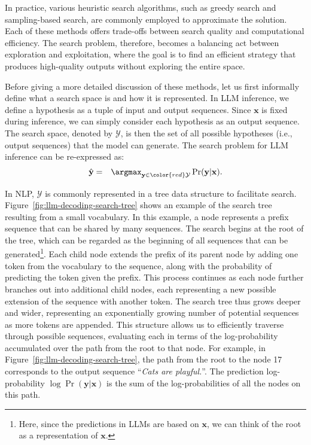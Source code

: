 In practice, various heuristic search algorithms, such as greedy search and sampling-based search, are commonly employed to approximate the solution. Each of these methods offers trade-offs between search quality and computational efficiency. The search problem, therefore, becomes a balancing act between exploration and exploitation, where the goal is to find an efficient strategy that produces high-quality outputs without exploring the entire space.

Before giving a more detailed discussion of these methods, let us first informally define what a search space is and how it is represented. In LLM inference, we define a hypothesis as a tuple of input and output sequences. Since $\mathbf{x}$ is fixed during inference, we can simply consider each hypothesis as an output sequence. The search space, denoted by $\mathcal{Y}$, is then the set of all possible hypotheses (i.e., output sequences) that the model can generate. The search problem for LLM inference can be re-expressed as:
\begin{eqnarray}
\hat{\mathbf{y}} & = & \argmax_{\mathbf{y} \in {\color{red} \mathcal{Y}}} \Pr(\mathbf{y}|\mathbf{x}). \label{eq:llm-general-decoding-objective}
\end{eqnarray}

In NLP, $\mathcal{Y}$ is commonly represented in a tree data structure to facilitate search. Figure~\ref{fig:llm-decoding-search-tree} shows an example of the search tree resulting from a small vocabulary. In this example, a node represents a prefix sequence that can be shared by many sequences. The search begins at the root of the tree, which can be regarded as the beginning of all sequences that can be generated\footnote{Here, since the predictions in LLMs are based on $\mathbf{x}$, we can think of the root as a representation of $\mathbf{x}$.}. Each child node extends the prefix of its parent node by adding one token from the vocabulary to the sequence, along with the probability of predicting the token given the prefix. This process continues as each node further branches out into additional child nodes, each representing a new possible extension of the sequence with another token. The search tree thus grows deeper and wider, representing an exponentially growing number of potential sequences as more tokens are appended. This structure allows us to efficiently traverse through possible sequences, evaluating each in terms of the log-probability accumulated over the path from the root to that node. For example, in Figure~\ref{fig:llm-decoding-search-tree}, the path from the root to the node 17 corresponds to the output sequence ``\textit{Cats are playful.}''. The prediction log-probability $\log \Pr(\mathbf{y}|\mathbf{x})$  is the sum of the log-probabilities of all the nodes on this path.

